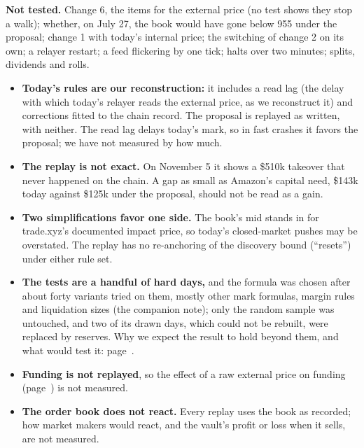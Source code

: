 {\begin{itemize}[leftmargin=1.3em,itemsep=0pt,topsep=0pt,parsep=0pt]
\end{itemize}
\textbf{Not tested.} Change 6, the items for the external price (no test shows they stop a walk); whether, on July 27, the book would have gone below 955 under the proposal; change 1 with today's internal price; the switching of change 2 on its own; a relayer restart; a feed flickering by one tick; halts over two minutes; splits, dividends and rolls.\par}



\label{sec:limits}

\begin{itemize}[leftmargin=1.3em,itemsep=.6ex,topsep=0pt]
\item \textbf{Today's rules are our reconstruction:} it includes a read lag (the delay with which today's relayer reads the external price, as we reconstruct it) and corrections fitted to the chain record. The proposal is replayed as written, with neither. The read lag delays today's mark, so in fast crashes it favors the proposal; we have not measured by how much.
\item \textbf{The replay is not exact.} On November 5 it shows a \$510k takeover that never happened on the chain. A gap as small as Amazon's capital need, \$143k today against \$125k under the proposal, should not be read as a gain.
\item \textbf{Two simplifications favor one side.} The book's mid stands in for trade.xyz's documented impact price, so today's closed-market pushes may be overstated. The replay has no re-anchoring of the discovery bound (``resets'') under either rule set.
\item \textbf{The tests are a handful of hard days,} and the formula was chosen after about forty variants tried on them, mostly other mark formulas, margin rules and liquidation sizes (the companion note); only the random sample was untouched, and two of its drawn days, which could not be rebuilt, were replaced by reserves. Why we expect the result to hold beyond them, and what would test it: page~\pageref{sec:tests}.
\item \textbf{Funding is not replayed}, so the effect of a raw external price on funding (page~\pageref{sec:costs}) is not measured.
\item \textbf{The order book does not react.} Every replay uses the book as recorded; how market makers would react, and the vault's profit or loss when it sells, are not measured.

\end{itemize}
